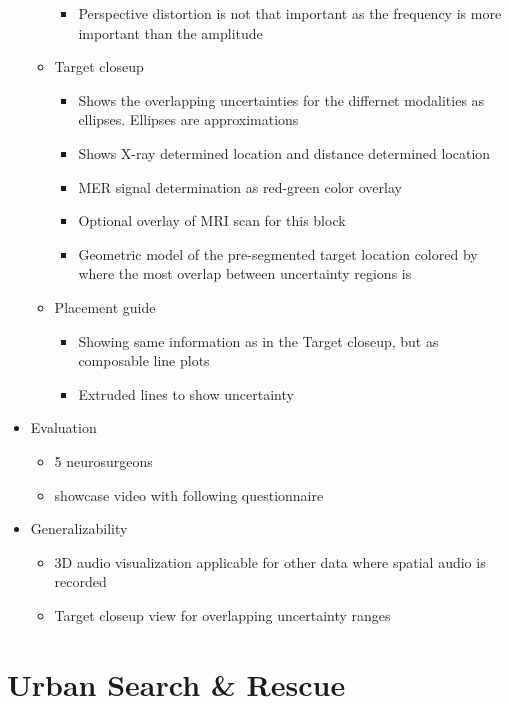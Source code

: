 \begin{itemize}
\begin{itemize}
\begin{itemize}
        \item Perspective distortion is not that important as the frequency is more important than the amplitude
    \end{itemize}
    \item Target closeup
    \begin{itemize}
        \item Shows the overlapping uncertainties for the differnet modalities as ellipses. Ellipses are approximations
        \item Shows X-ray determined location and distance determined location
        \item MER signal determination as red-green color overlay
        \item Optional overlay of MRI scan for this block
        \item Geometric model of the pre-segmented target location colored by where the most overlap between uncertainty regions is
    \end{itemize}
    \item Placement guide
    \begin{itemize}
        \item Showing same information as in the Target closeup, but as composable line plots
        \item Extruded lines to show uncertainty
    \end{itemize}
\end{itemize}
\item Evaluation
\begin{itemize}
    \item 5 neurosurgeons
    \item showcase video with following questionnaire

\end{itemize}
\item Generalizability
\begin{itemize}
    \item 3D audio visualization applicable for other data where spatial audio is recorded
    \item Target closeup view for overlapping uncertainty ranges
\end{itemize}
\end{itemize}

\section{Urban Search \& Rescue}
\label{contributions:usar}

